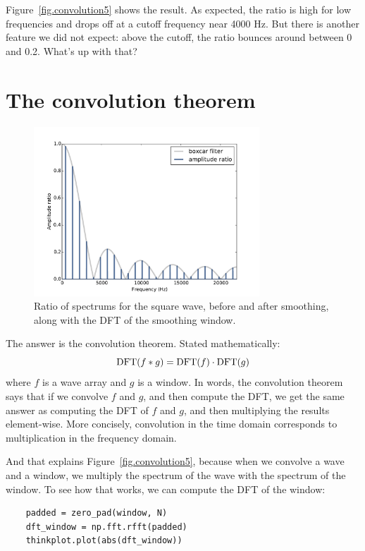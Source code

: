 \documentclass[12pt]{book}
\begin{document}
Figure~\ref{fig.convolution5} shows the result.  As expected, the
ratio is high for low frequencies and drops off at a cutoff frequency
near 4000 Hz.  But there is another feature we did not expect: above
the cutoff, the ratio bounces around between 0 and 0.2.
What's up with that?


\section{The convolution theorem}
\label{convtheorem}

\begin{figure}
\centerline{\includegraphics[height=2.5in]{figs/convolution6.pdf}}
\caption{Ratio of spectrums for the square wave, before and after
  smoothing, along with the DFT of the smoothing window.}
\label{fig.convolution6}
\end{figure}

\newcommand{\DFT}{\mathrm{DFT}}
\newcommand{\IDFT}{\mathrm{IDFT}}

The answer is the convolution theorem.  Stated mathematically:
%
\[ \DFT(f \conv g) = \DFT(f) \cdot \DFT(g) \]
%
where $f$ is a wave array and $g$ is a window.  In words,
the convolution theorem says that if we convolve $f$ and $g$,
and then compute the DFT, we get the same answer as computing
the DFT of $f$ and $g$, and then multiplying the results
element-wise.  More concisely, convolution in the time
domain corresponds to multiplication in the frequency domain.

And that explains Figure~\ref{fig.convolution5}, because when we
convolve a wave and a window, we multiply the spectrum of
the wave with the spectrum of the window.  To see how that works,
we can compute the DFT of the window:

\begin{verbatim}
    padded = zero_pad(window, N)
    dft_window = np.fft.rfft(padded)
    thinkplot.plot(abs(dft_window))
\end{verbatim}
\end{document}
